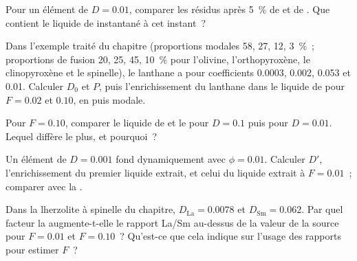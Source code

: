 \begin{exercise}[$\star\star$]\label{exo:b3:trace-element-modelling:5}
Pour un élément de $D = 0.01$, comparer les résidus après \qty{5}{\percent}
de  et de . Que contient le liquide de  instantané à cet instant~?
\end{exercise}

\begin{exercise}[$\star\star$]\label{exo:b3:trace-element-modelling:6}
Dans l'exemple traité du chapitre (proportions modales 58, 27, 12, \qty{3}{\percent}~;
proportions de fusion 20, 25, 45, \qty{10}{\percent} pour l'olivine,
l'orthopyroxène, le clinopyroxène et le spinelle), le lanthane a pour coefficients
0.0003, 0.002, 0.053 et 0.01. Calculer $D_0$ et $P$, puis l'enrichissement du
lanthane dans le liquide de  pour $F = 0.02$ et $0.10$, en  puis modale.
\end{exercise}

\begin{exercise}[$\star\star$]\label{exo:b3:trace-element-modelling:7}
Pour $F = 0.10$, comparer le liquide de  et le  pour $D = 0.1$ puis pour $D = 0.01$. Lequel diffère le plus, et pourquoi~?
\end{exercise}

\begin{exercise}[$\star\star$]\label{exo:b3:trace-element-modelling:8}
Un élément de $D = 0.001$ fond dynamiquement avec $\phi = 0.01$. Calculer
$D'$, l'enrichissement du premier liquide extrait, et celui du liquide extrait
à $F = 0.01$~; comparer avec la .
\end{exercise}

\begin{exercise}[$\star\star$]\label{exo:b3:trace-element-modelling:9}
Dans la lherzolite à spinelle du chapitre, $D_{\mathrm{La}} = 0.0078$ et
$D_{\mathrm{Sm}} = 0.062$. Par quel facteur la  augmente-t-elle le rapport La/Sm
au-dessus de la valeur de la source pour $F = 0.01$ et $F = 0.10$~? Qu'est-ce que cela
indique sur l'usage des rapports pour estimer $F$~?
\end{exercise}


